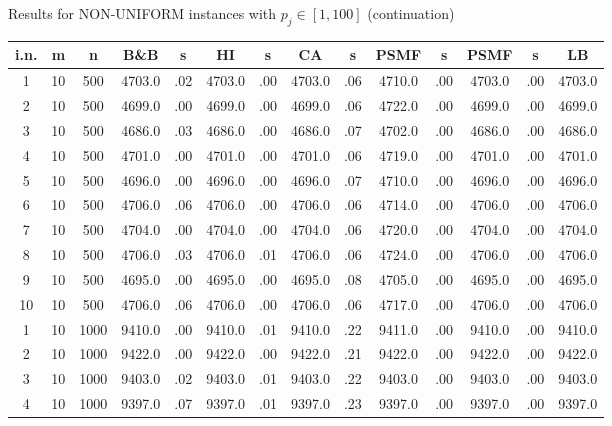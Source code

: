 \documentclass[12pt,a4paper]{article}
\begin{document}
\begin{center}
{\footnotesize  Results for NON-UNIFORM instances with $p_j \in
[1,100]$ (continuation)} {\tiny
\begin{tabular}{|ccc|cc|cc|cc|cc|cc|c|}\hline
{\bf i.n.}&{\bf m}&{\bf n}&{\bf B\&B}&{\bf s}&{\bf HI}&{\bf s}&{\bf
CA}&{\bf s}&{\bf PSMF}&{\bf s}&{\bf PSMF}&{\bf s}&{\bf LB}
\\\hline
1             &  10& 500&   4703.0&  .02&   4703.0&  .00&   4703.0&  .06&   4710.0&  .00&   4703.0&  .00&   4703.0\\[-0.01in]
2             &  10& 500&   4699.0&  .00&   4699.0&  .00&   4699.0&  .06&   4722.0&  .00&   4699.0&  .00&   4699.0\\[-0.01in]
3             &  10& 500&   4686.0&  .03&   4686.0&  .00&   4686.0&  .07&   4702.0&  .00&   4686.0&  .00&   4686.0\\[-0.01in]
4             &  10& 500&   4701.0&  .00&   4701.0&  .00&   4701.0&  .06&   4719.0&  .00&   4701.0&  .00&   4701.0\\[-0.01in]
5             &  10& 500&   4696.0&  .00&   4696.0&  .00&   4696.0&  .07&   4710.0&  .00&   4696.0&  .00&   4696.0\\[-0.01in]
6             &  10& 500&   4706.0&  .06&   4706.0&  .00&   4706.0&  .06&   4714.0&  .00&   4706.0&  .00&   4706.0\\[-0.01in]
7             &  10& 500&   4704.0&  .00&   4704.0&  .00&   4704.0&  .06&   4720.0&  .00&   4704.0&  .00&   4704.0\\[-0.01in]
8             &  10& 500&   4706.0&  .03&   4706.0&  .01&   4706.0&  .06&   4724.0&  .00&   4706.0&  .00&   4706.0\\[-0.01in]
9             &  10& 500&   4695.0&  .00&   4695.0&  .00&   4695.0&  .08&   4705.0&  .00&   4695.0&  .00&   4695.0\\[-0.01in]
10            &  10& 500&   4706.0&  .06&   4706.0&  .00&   4706.0&  .06&   4717.0&  .00&   4706.0&  .00&   4706.0\\[-0.01in]
1             &  10&1000&   9410.0&  .00&   9410.0&  .01&   9410.0&  .22&   9411.0&  .00&   9410.0&  .00&   9410.0\\[-0.01in]
2             &  10&1000&   9422.0&  .00&   9422.0&  .00&   9422.0&  .21&   9422.0&  .00&   9422.0&  .00&   9422.0\\[-0.01in]
3             &  10&1000&   9403.0&  .02&   9403.0&  .01&   9403.0&  .22&   9403.0&  .00&   9403.0&  .00&   9403.0\\[-0.01in]
4             &  10&1000&   9397.0&  .07&   9397.0&  .01&   9397.0&  .23&   9397.0&  .00&   9397.0&  .00&   9397.0\\[-0.01in]

\end{tabular}}
\end{center}
\end{document}
